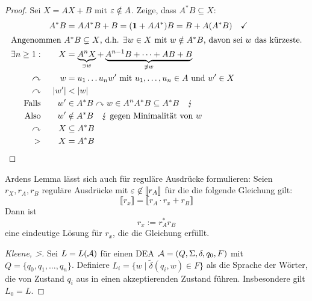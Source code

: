 {\begin{proof}
Sei $ X= AX+B$ mit $\varepsilon\notin A$. Zeige, dass $A^*B \subseteq X$:
        \begin{alignat*}{3}
                && A^*B &= AA^*B + B = (\mathbf{1}+AA^*)B = B+A(A^*B) \quad\checkmark\\
                \shortintertext{Angenommen $A^*B \subsetneq X$, d.h. $\exists w\in X$ mit $w\notin A^*B$, davon sei $w$ das kürzeste.}
                \exists n\geq 1: && X &= \underbrace{A^nX}_{\ni w} + \underbrace{A^{n-1}B+\dots +AB+B}_{\not\ni w}\\
                \curvearrowright && w &= u_1\dots u_n w'\text{ mit } u_1,\dots,u_n\in A\text{ und } w'\in X\\
                \curvearrowright && |w'| &< |w|\\
                \text{Falls}&& w'&\in A^*B \curvearrowright w\in A^nA^*B\subseteq A^*B \quad \lightning\\
                \text{Also} && w'&\notin A^*B \quad\lightning\text{ gegen Minimalität von }w\\
                \curvearrowright && X&\subseteq A^*B\\
                \-> && X &= A^*B \tag*{\qedhere}
        \end{alignat*}
\end{proof}

\begin{Korollar}
  Ardens Lemma lässt sich auch für reguläre Ausdrücke formulieren: Seien $r_X,r_A,r_B$ reguläre Ausdrücke mit $\varepsilon \not \in \llbracket r_A \rrbracket$ für die die folgende Gleichung gilt:
  \begin{displaymath}
    \llbracket r_x \rrbracket = \llbracket r_A \cdot r_x + r_B \rrbracket
  \end{displaymath}
  Dann ist 
  \begin{displaymath}
    r_x := r_A^*r_B
  \end{displaymath}
  eine eindeutige Lösung für $r_x$, die die Gleichung erfüllt.
\end{Korollar}


\begin{proof}[Kleene, \=>]
  Sei $L=L(\mathcal{A})$ für einen \ac{DEA} $\mathcal{A}=({Q},\Sigma,\delta,q_0,F)$ mit $Q = \{q_0,q_1,\dots,q_n\}$.
        Definiere $L_i=\{ w \mid \tilde\delta(q_i,w)\in F \}$ als die Sprache der Wörter, die von Zustand $q_i$ aus in einen akzeptierenden Zustand führen.
  Insbesondere gilt $L_0 = L$.


\end{proof}}
